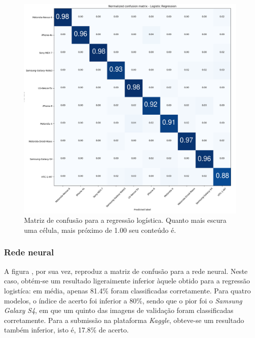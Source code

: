 \documentclass[10pt,twocolumn,letterpaper]{article}
\begin{document}
\begin{figure}
    \centering
    \includegraphics[width=\columnwidth]{images/lr-no_crop.png}
    \caption{Matriz de confusão para a regressão logística. Quanto mais escura uma célula, mais próximo de 1.00 seu conteúdo é.}
    \label{img:lr1}
\end{figure}

\subsubsection {Rede neural}

A figura \label{img:nn1}, por sua vez, reproduz a matriz de confusão para a rede neural. Neste caso, obtém-se um resultado ligeraimente inferior àquele obtido para a regressão logistíca: em média, apenas 81.4\% foram classificadas corretamente. Para quatro modelos, o índice de acerto foi inferior a 80\%, sendo que o pior foi o \textit{Samsung Galaxy S4}, em que um quinto das imagens de validação foram classificadas corretamente. Para a submissão na plataforma \textit{Kaggle}, obteve-se um resultado também inferior, isto é, 17.8\% de acerto.
\end{document}
